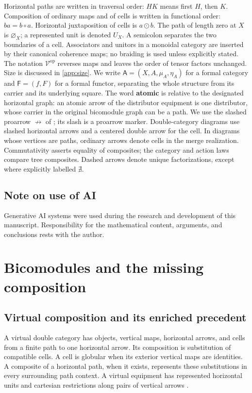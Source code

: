 \documentclass[11pt,reqno]{amsart}
\theoremstyle{plain}
\theoremstyle{definition}
\theoremstyle{remark}
\numberwithin{equation}{section}
\newcommand{\V}{\mathcal V}
\newcommand{\harr}{\mathrel{\nrightarrow}}
\newcommand{\emp}[1]{\varnothing_{#1}}
\newcommand{\op}{\mathrm{op}}
\newcommand{\wh}{\mathbin{\odot}}
\begin{document}
Horizontal paths are written in traversal order: $HK$ means first $H$,
then $K$. Composition of ordinary maps and of cells is written in functional
order: $ba=b\circ a$. Horizontal juxtaposition of cells is $a\wh b$.
The path of length zero at $X$ is $\emp X$; a represented unit is denoted
$U_X$. A semicolon separates the two boundaries of a cell.
Associators and unitors in a monoidal category are inserted by their
canonical coherence maps; no braiding is used unless explicitly stated.
The notation $\V^\op$ reverses maps and leaves the order of tensor factors
unchanged. Size is discussed in \cref{app:size}.
We write $\mathsf A=(X,A,\mu_A,\eta_A)$ for a formal category and
$\mathsf F=(f,F)$ for a formal functor, separating the whole structure
from its carrier and its underlying square. The word \textbf{atomic} is
relative to the designated horizontal graph: an atomic arrow of the
distributor equipment is one distributor, whose carrier in the original
bicomodule graph can be a path.
We use the slashed proarrow $\harr$ of
\cite[Definition 2.1]{CruttwellShulman2010}; its slash is a proarrow
marker. Double-category diagrams use slashed horizontal arrows and a
centered double arrow for the cell. In diagrams whose vertices are paths,
ordinary arrows denote cells in the merge realization. Commutativity
asserts equality of composites; the category and action laws compare
tree composites. Dashed arrows denote unique factorizations, except
where explicitly labelled $\nexists$.

\subsection*{Note on use of AI}
Generative AI systems were used during the research and development of this manuscript. Responsibility for the mathematical content,
arguments, and conclusions rests with the author.


\section{Bicomodules and the missing composition}\label{sec:bicomod}

\subsection{Virtual composition and its enriched precedent}
A virtual double category has objects, vertical maps, horizontal arrows,
and cells from a finite path to one horizontal arrow. Its composition is
substitution of compatible cells. A cell is globular when its exterior
vertical maps are identities. A composite of a horizontal path, when
it exists, represents these substitutions in every surrounding path
context. A virtual equipment has represented horizontal units and
cartesian restrictions along pairs of vertical arrows
\cite[Sections 2, 5, and 7]{CruttwellShulman2010}.
\end{document}
